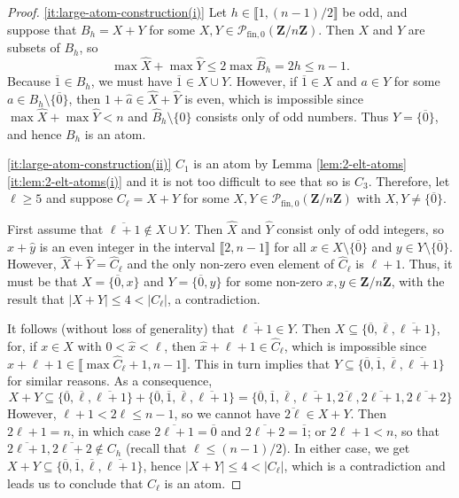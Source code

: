 \documentclass{report}
\newcommand{\llb}{\llbracket}
\newcommand{\rrb}{\rrbracket}
\newcommand{\fin}{\textrm{fin}}
\renewcommand{\:}{\text{:}}
\theoremstyle{definition}
\begin{document}
\begin{proof}
	\ref{it:large-atom-construction(i)} Let $h \in \llb 1, (n-1)/2 \rrb$ be odd, and suppose that $B_h = X + Y$ for some $X,Y\in \mathcal P_{\fin,0}(\mathbf Z/n\mathbf Z)$.
	Then $X$ and $Y$ are subsets of $B_h$, so
	\[
	\max\hat{X} + \max\hat{Y} \le 2\max\hat{B}_h = 2h \le n-1.
	\]
	Because $\overline{1}\in B_h$, we must have $\overline{1}\in X\cup Y$.
	However, if $\overline{1}\in X$ and $a\in Y$ for some $a \in B_h\setminus\{\overline{0}\}$, then  $1+\hat{a} \in \hat{X} + \hat{Y}$ is even, which is impossible since $\max\hat{X} + \max\hat{Y} < n$ and $\hat{B}_h \setminus\{0\}$ consists only of odd numbers.
	Thus $Y = \{\overline{0}\}$, and hence $B_h$ is an atom.
	
	\ref{it:large-atom-construction(ii)}
	$C_1$ is an atom by Lemma \ref{lem:2-elt-atoms}\ref{it:lem:2-elt-atoms(i)} and it is not too difficult to see that so is $C_3$. Therefore, let $\ell\ge 5$ and suppose $C_\ell = X+Y$ for some $X,Y\in \mathcal P_{\fin,0}(\mathbf Z/n\mathbf Z)$ with $X,Y\neq\bigl\{\overline{0}\bigr\}$.
	
	First assume that $\overline{\ell+1}\notin X\cup Y$. Then $\hat{X}$ and $\hat{Y}$ consist only of odd integers, so $\hat{x}+\hat{y}$ is an even integer in the interval $\llb 2, n-1 \rrb$ for all $x\in X\setminus\bigl\{\overline{0}\bigr\}$ and $y\in Y\setminus\bigl\{\overline{0}\bigr\}$.
	However, $\hat{X}+\hat{Y} = \hat{C}_\ell$ and the only non-zero even element of $\hat{C}_\ell$ is $\ell+1$. Thus, it must be that $X = \bigl\{\overline{0},x\bigr\}$ and $Y = \bigl\{\overline{0},y\bigr\}$ for some non-zero $x, y \in \mathbf Z/n\mathbf Z$, with the result that $|X+Y| \le 4 < |C_\ell|$, a contradiction.
	
	It follows (without loss of generality) that $\overline{\ell+1}\in Y$.
	Then $X \subseteq \bigl\{\overline{0},\overline{\ell},\overline{\ell+1}\bigr\}$, for, if $x\in X$ with $0 < \hat{x} < \ell$, then $\hat{x} + \ell+1 \in \hat{C}_\ell$, which is impossible since $\hat{x}+\ell+1 \in \llb \max\hat{C}_\ell+1 , n-1 \rrb$.
	This in turn implies that $Y \subseteq \bigl\{\overline{0},\overline{1},\overline{\ell},\overline{\ell+1}\bigr\}$ for similar reasons. As a consequence,
	\[
	X+Y
	\subseteq \bigl\{\overline{0},\overline{\ell},\overline{\ell+1}\bigr\}
	+ \bigl\{\overline{0},\overline{1},\overline{\ell},\overline{\ell+1}\bigr\}
	= \bigl\{ \overline{0}, \overline{1}, \overline{\ell}, \overline{\ell+1}, \overline{2\ell},\overline{2\ell+1}, \overline{2\ell+2} \bigr\}
	\]
	However, $\ell+1 < 2\ell \le n-1$, so we cannot have $\overline{2\ell}\in X+Y$. Then $2\ell+1 = n$, in which case $\overline{2\ell+1} = \overline{0}$ and $\overline{2\ell+2} = \overline{1}$; or $2\ell+1 < n$, so that $\overline{2\ell+1}, \overline{2\ell+2} \notin C_h$ (recall that $\ell \le (n-1)/2$). In either case, we get $X+Y \subseteq \bigl\{ \overline{0}, \overline{1}, \overline{\ell}, \overline{\ell+1}\bigr\}$, hence $|X+Y| \le 4 < |C_\ell|$, which is a contradiction and leads us to conclude that $C_\ell$ is an atom.
\end{proof}
\end{document}
